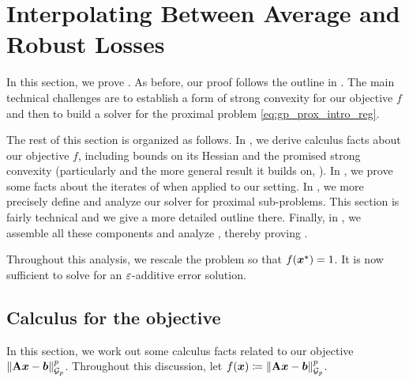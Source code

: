 \section{Interpolating Between Average and Robust Losses}
\label{sec:gp_interpolating_proof}

In this section, we prove . As before, our proof follows the outline in . The main technical challenges are to establish a form of strong convexity for our objective $f$ and then to build a solver for the proximal problem \eqref{eq:gp_prox_intro_reg}. 

The rest of this section is organized as follows. In , we derive calculus facts about our objective $f$, including bounds on its Hessian and the promised strong convexity (particularly  and the more general result it builds on, ). In , we prove some facts about the iterates of  when applied to our setting. In , we more precisely define and analyze our solver for proximal sub-problems. This section is fairly technical and we give a more detailed outline there. Finally, in , we assemble all these components and analyze , thereby proving .

Throughout this analysis, we rescale the problem so that $f(\bm{x}^{\star}) = 1$. It is now sufficient to solve for an $\varepsilon$-additive error solution.

\subsection{Calculus for the objective}
\label{sec:gp_objective_calculus}

In this section, we work out some calculus facts related to our objective $\left\lVert \mathbf{A}\bm{x}-\bm{b} \right\rVert_{\mathcal{G}_{p}}^p$. Throughout this discussion, let $f(\bm{x}) \coloneqq \left\lVert \mathbf{A}\bm{x}-\bm{b} \right\rVert_{\mathcal{G}_{p}}^p$.

